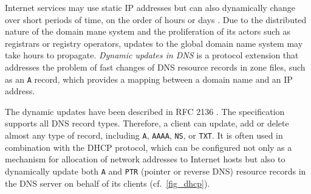 Internet services may use static IP addresses but can also dynamically change over short periods of time, on the order of hours or days \cite{gio}.
Due to the distributed nature of the domain mane system and the proliferation of its actors such as registrars or registry operators, updates to the global domain name system may take hours to propagate. 
%
\textit{Dynamic updates in DNS} is a protocol extension that addresses the problem of fast changes of DNS resource records in zone files, such as an \texttt{A} record, which provides a mapping between a domain name and an IP address.

The dynamic updates have been described in RFC 2136 \cite{rfc2136}. 
The specification supports all DNS record types.
Therefore, a client can update, add or delete almost any type of record, including \texttt{A}, \texttt{AAAA}, \texttt{NS}, or \texttt{TXT}.
It is often used %
in combination with the DHCP protocol, which can be configured not only as a mechanism for allocation of network addresses to Internet hosts but also to dynamically update both \texttt{A} and \texttt{PTR} (pointer or reverse DNS) resource records in the DNS server %
on behalf of its clients (cf.~\autoref{fig_dhcp}).




%




